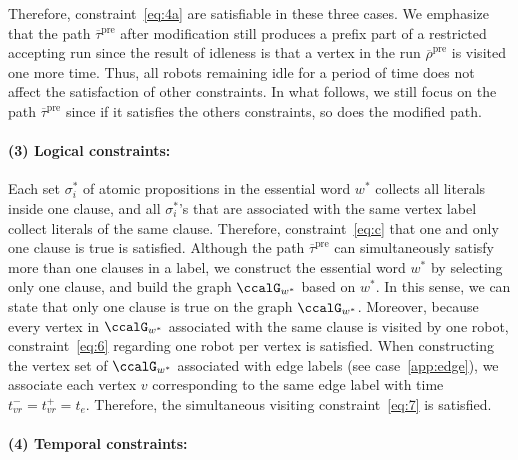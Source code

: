 \documentclass[Afour,sageh,times]{sagej}
\begin{document}
{{Therefore, constraint~\eqref{eq:4a} are satisfiable in these three cases. We emphasize that the path $\overline{\tau}^\text{pre}$ after modification still produces a prefix part of a restricted accepting run since the result of idleness is  that a vertex in the run $\overline{\rho}^{\text{pre}}$ is visited one more time.  Thus, all robots remaining idle for a period of time does not affect the satisfaction of other constraints. In what follows, we still focus on the path $\overline{\tau}^\text{pre}$ since if it satisfies the others constraints, so does the modified path.

\paragraph{(3) Logical constraints:} Each set $\sigma^*_i$ of atomic propositions in the essential word $w^*$ collects all literals inside one clause, and all $\sigma^*_i$'s that are associated with the same vertex label collect literals of the same clause. Therefore, constraint~\eqref{eq:c} that one and only one clause is true is satisfied. Although the path $\overline{\tau}^\text{pre}$ can simultaneously satisfy more than one clauses in a label, we construct the essential word $w^*$ by selecting only one clause, and build the graph $\ccalG_{w^*}$ based on $w^*$. In this sense, we can state that only one clause is true on the graph $\ccalG_{w^*}$. Moreover, because every vertex in $\ccalG_{w^*}$ associated with the same clause is visited by one robot, constraint~\eqref{eq:6} regarding one robot per vertex is satisfied.  When constructing the vertex set of $\ccalG_{w^*}$ associated with edge labels (see case~\ref{app:edge}), we associate each vertex $v$ corresponding to the same edge label with time $t_{vr}^- = t_{vr}^+ = t_e$. Therefore, the simultaneous visiting constraint~\eqref{eq:7} is satisfied.

\paragraph{(4) Temporal constraints:}
}}
\end{document}
